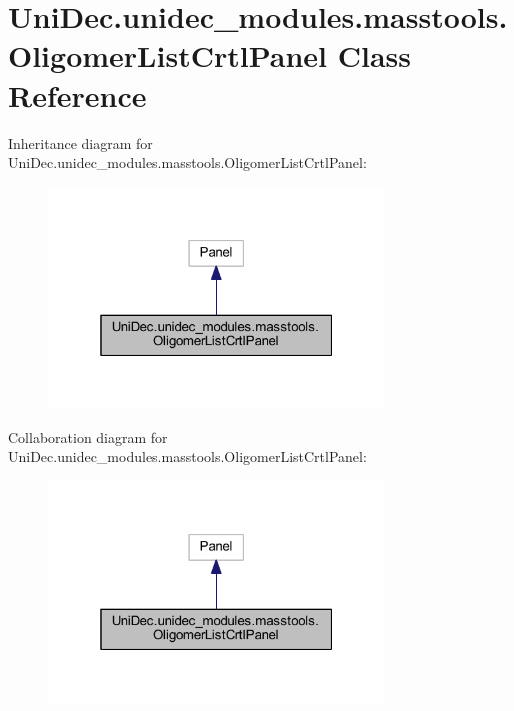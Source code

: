 \hypertarget{class_uni_dec_1_1unidec__modules_1_1masstools_1_1_oligomer_list_crtl_panel}{}\section{Uni\+Dec.\+unidec\+\_\+modules.\+masstools.\+Oligomer\+List\+Crtl\+Panel Class Reference}
\label{class_uni_dec_1_1unidec__modules_1_1masstools_1_1_oligomer_list_crtl_panel}


Inheritance diagram for Uni\+Dec.\+unidec\+\_\+modules.\+masstools.\+Oligomer\+List\+Crtl\+Panel\+:\nopagebreak
\begin{figure}[H]
\begin{center}
\leavevmode
\includegraphics[width=253pt]{class_uni_dec_1_1unidec__modules_1_1masstools_1_1_oligomer_list_crtl_panel__inherit__graph}
\end{center}
\end{figure}


Collaboration diagram for Uni\+Dec.\+unidec\+\_\+modules.\+masstools.\+Oligomer\+List\+Crtl\+Panel\+:\nopagebreak
\begin{figure}[H]
\begin{center}
\leavevmode
\includegraphics[width=253pt]{class_uni_dec_1_1unidec__modules_1_1masstools_1_1_oligomer_list_crtl_panel__coll__graph}
\end{center}
\end{figure}
